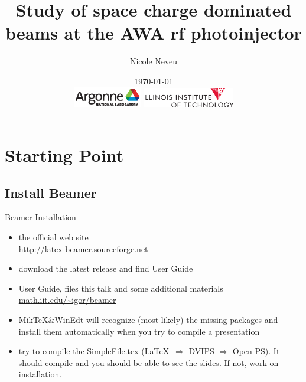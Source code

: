 \documentclass[professionalfont]{beamer}
\title[Space Charge 2017]{Study of space charge dominated beams at the AWA rf photoinjector}
\author[N.Neveu]{{\Large Nicole Neveu}}
\institute[ANL, IIT] %
{   Illinois Institute of Technology \\
	Argonne National Laboratory \\
    \url{nneveu@anl.gov} 
}
\date{ \today \\
\includegraphics[width=3cm,keepaspectratio]{../images/Argonne_cmyk_black}%
\hfill \hfill \hfill%
\includegraphics[width=4cm,keepaspectratio]{../images/IIT_logo}%
}
\begin{document}
\begin{frame}
  \titlepage
\end{frame}







\section{Starting Point}

\subsection{Install Beamer}

\begin{frame}{Beamer Installation}

\begin{itemize}

\item the official web site \\[.2cm]
\quad \url{http://latex-beamer.sourceforge.net} \\[.4cm]

\item download the latest release and find User Guide \\[.4cm]

\item User Guide, files this talk and some additional materials \\[.2cm]
\quad \url{ math.iit.edu/~igor/beamer} \\[.4cm]

\item Mik\TeX\&WinEdt will recognize (most likely) the missing packages and install them automatically
when you try to compile a presentation \\[.4cm]

\item try to compile  the SimpleFile.tex (\LaTeX \  $\Rightarrow$ DVIPS $\Rightarrow$ Open PS).
It should compile and
you should be able to see the slides. If not, work on installation.
\end{itemize}
\end{frame}
\end{document}
